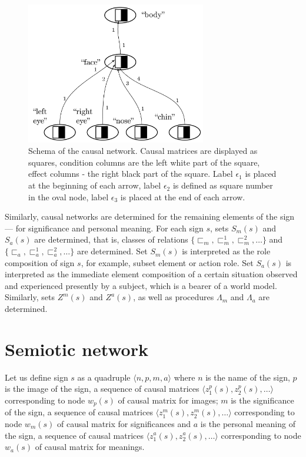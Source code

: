 \documentclass[review]{elsarticle}
\begin{document}
\begin{figure}
	\centering
	\includegraphics[width=0.7\textwidth]{caus_net_en}
	\caption{Schema of the causal network. Causal matrices are displayed as squares, condition columns are the left white part of the square,  effect columns - the right black part of the square. Label $\epsilon_1$ is placed at the beginning of each arrow, label $\epsilon_2$ is defined as square number in the oval node, label $\epsilon_3$  is placed at the end of each arrow.}
	\label{fig:caus_net}		
\end{figure}

Similarly, causal networks are determined for the remaining elements of the sign --- for significance and personal meaning. For each sign $s$, sets $S_m(s)$ and $S_a(s)$ are determined, that is, classes of relations $\{\sqsubset_m,\sqsubset_m^1,\sqsubset_m^2,\dots\}$ and $\{\sqsubset_a,\sqsubset_a^1,\sqsubset_a^2,\dots\}$ are determined. Set $S_m(s)$ is interpreted as the role composition of sign $s$, for example, subset element or action role. Set $S_a(s)$ is interpreted as the immediate element composition of a certain situation observed and experienced presently by a subject, which is a bearer of a world model. Similarly, sets $Z^m(s)$ and $Z^a(s)$, as well as procedures $\Lambda_m$ and $\Lambda_a$ are determined.


\section{Semiotic network}

Let us define sign $s$ as a quadruple $\langle n, p, m, a\rangle$ where $n$ is the name of the sign, $p$ is the image of the sign, a sequence of causal matrices $\langle z_1^p(s), z_2^p(s), \dots\rangle$ corresponding to node $w_p(s)$ of causal matrix for images; $m$ is the significance of the sign, a sequence of causal matrices $\langle z_1^m(s), z_2^m(s), \dots\rangle$ corresponding to node $w_m(s)$ of causal matrix for significances and $a$ is the personal meaning of the sign, a sequence of causal matrices $\langle z_1^a(s), z_2^a(s), \dots\rangle$ corresponding to node $w_a(s)$ of causal matrix for meanings.
\end{document}
